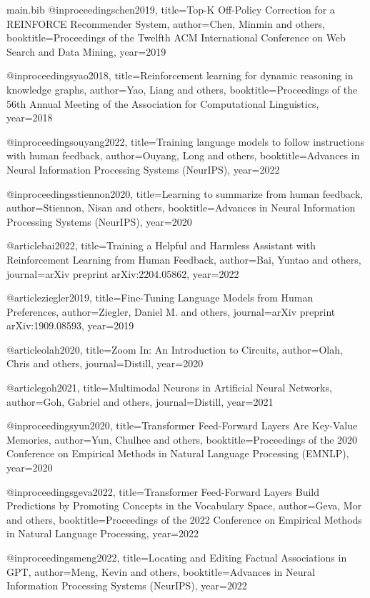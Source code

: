 \begin{filecontents*}{main.bib}
@inproceedings{chen2019,
  title={Top-K Off-Policy Correction for a REINFORCE Recommender System},
  author={Chen, Minmin and others},
  booktitle={Proceedings of the Twelfth ACM International Conference on Web Search and Data Mining},
  year={2019}
}

@inproceedings{yao2018,
  title={Reinforcement learning for dynamic reasoning in knowledge graphs},
  author={Yao, Liang and others},
  booktitle={Proceedings of the 56th Annual Meeting of the Association for Computational Linguistics},
  year={2018}
}

@inproceedings{ouyang2022,
  title={Training language models to follow instructions with human feedback},
  author={Ouyang, Long and others},
  booktitle={Advances in Neural Information Processing Systems (NeurIPS)},
  year={2022}
}

@inproceedings{stiennon2020,
  title={Learning to summarize from human feedback},
  author={Stiennon, Nisan and others},
  booktitle={Advances in Neural Information Processing Systems (NeurIPS)},
  year={2020}
}

@article{bai2022,
  title={Training a Helpful and Harmless Assistant with Reinforcement Learning from Human Feedback},
  author={Bai, Yuntao and others},
  journal={arXiv preprint arXiv:2204.05862},
  year={2022}
}

@article{ziegler2019,
  title={Fine-Tuning Language Models from Human Preferences},
  author={Ziegler, Daniel M. and others},
  journal={arXiv preprint arXiv:1909.08593},
  year={2019}
}

@article{olah2020,
  title={Zoom In: An Introduction to Circuits},
  author={Olah, Chris and others},
  journal={Distill},
  year={2020}
}

@article{goh2021,
  title={Multimodal Neurons in Artificial Neural Networks},
  author={Goh, Gabriel and others},
  journal={Distill},
  year={2021}
}

@inproceedings{yun2020,
  title={Transformer Feed-Forward Layers Are Key-Value Memories},
  author={Yun, Chulhee and others},
  booktitle={Proceedings of the 2020 Conference on Empirical Methods in Natural Language Processing (EMNLP)},
  year={2020}
}

@inproceedings{geva2022,
  title={Transformer Feed-Forward Layers Build Predictions by Promoting Concepts in the Vocabulary Space},
  author={Geva, Mor and others},
  booktitle={Proceedings of the 2022 Conference on Empirical Methods in Natural Language Processing},
  year={2022}
}

@inproceedings{meng2022,
  title={Locating and Editing Factual Associations in GPT},
  author={Meng, Kevin and others},
  booktitle={Advances in Neural Information Processing Systems (NeurIPS)},
  year={2022}
}


\end{filecontents*}
